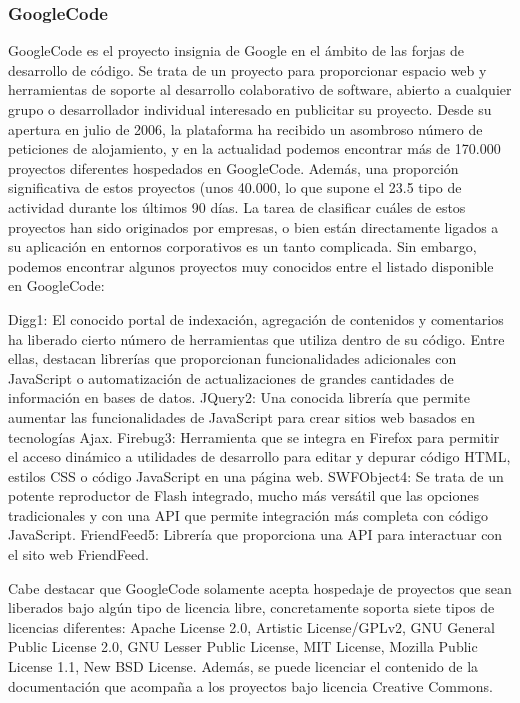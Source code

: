 \subsubsection{GoogleCode}
\label{subsub:googlecode}

GoogleCode es el proyecto insignia de Google en el ámbito de las forjas de desarrollo de
código. Se trata de un proyecto para proporcionar espacio web y herramientas de soporte
al desarrollo colaborativo de software, abierto a cualquier grupo o desarrollador individual
interesado en publicitar su proyecto.
Desde su apertura en julio de 2006, la plataforma ha recibido un asombroso número de
peticiones de alojamiento, y en la actualidad podemos encontrar más de 170.000
proyectos diferentes hospedados en GoogleCode. Además, una proporción significativa
de estos proyectos (unos 40.000, lo que supone el 23.5%
tipo de actividad durante los últimos 90 días.
La tarea de clasificar cuáles de estos proyectos han sido originados por empresas, o bien
están directamente ligados a su aplicación en entornos corporativos es un tanto
complicada. Sin embargo, podemos encontrar algunos proyectos muy conocidos entre el
listado disponible en GoogleCode:

Digg1: El conocido portal de indexación, agregación de contenidos y comentarios
 ha liberado cierto número de herramientas que utiliza dentro de su código. Entre
  ellas, destacan librerías que proporcionan funcionalidades adicionales con
  JavaScript o automatización de actualizaciones de grandes cantidades de
  información en bases de datos.
JQuery2: Una conocida librería que permite aumentar las funcionalidades de
    JavaScript para crear sitios web basados en tecnologías Ajax.
Firebug3: Herramienta que se integra en Firefox para permitir el acceso dinámico a
    utilidades de desarrollo para editar y depurar código HTML, estilos CSS o código
     JavaScript en una página web.
SWFObject4: Se trata de un potente reproductor de Flash integrado, mucho más
    versátil que las opciones tradicionales y con una API que permite integración más
      completa con código JavaScript.
FriendFeed5: Librería que proporciona una API para interactuar con el sito web
    FriendFeed.

Cabe destacar que GoogleCode solamente acepta hospedaje de proyectos que sean
liberados bajo algún tipo de licencia libre, concretamente soporta siete tipos de licencias
diferentes: Apache License 2.0, Artistic License/GPLv2, GNU General Public License 2.0, GNU Lesser Public License, MIT License, Mozilla Public License 1.1, New BSD License.
Además, se puede licenciar el contenido de la documentación que acompaña a los
proyectos bajo licencia Creative Commons.

